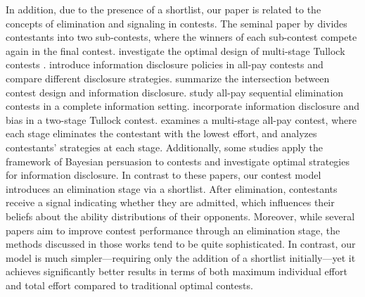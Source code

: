 In addition, due to the presence of a shortlist, our paper is related to the concepts of elimination and signaling in contests. The seminal paper by \cite{MS06} divides contestants into two sub-contests, where the winners of each sub-contest compete again in the final contest. \cite{FL12} investigate the optimal design of multi-stage Tullock contests \cite{T08}. \cite{LMZ18} introduce information disclosure policies in all-pay contests and compare different disclosure strategies. \cite{LSA19} summarize the intersection between contest design and information disclosure. \cite{MPS21} study all-pay sequential elimination contests in a complete information setting. \cite{FW22} incorporate information disclosure and bias in a two-stage Tullock contest. \cite{R24} examines a multi-stage all-pay contest, where each stage eliminates the contestant with the lowest effort, and analyzes contestants' strategies at each stage.
Additionally, some studies \cite{CKZ17, C24, KZZ24} apply the framework of Bayesian persuasion to contests and investigate optimal strategies for information disclosure.
In contrast to these papers, our contest model introduces an elimination stage via a shortlist. After elimination, contestants receive a signal indicating whether they are admitted, which influences their beliefs about the ability distributions of their opponents. Moreover, while several papers aim to improve contest performance through an elimination stage, the methods discussed in those works tend to be quite sophisticated. In contrast, our model is much simpler—requiring only the addition of a shortlist initially—yet it achieves significantly better results in terms of both maximum individual effort and total effort compared to traditional optimal contests.


